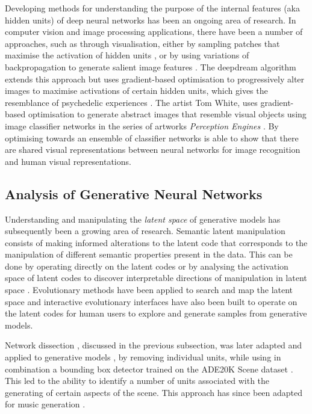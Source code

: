 Developing methods for understanding the purpose of the internal features (aka hidden units) of deep neural networks has been an ongoing area of research. 
In computer vision and image processing applications, there have been a number of approaches, such as through visualisation, either by sampling patches that maximise the activation of hidden units \cite{zeiler2014visualizing, zhou2014object}, or by using variations of backpropagation to generate salient image features \cite{zeiler2014visualizing, simonyan2013deep}. 
The deepdream algorithm \citep{mordvintsev2015inceptionism} extends this approach but uses gradient-based optimisation to progressively alter images to maximise activations of certain hidden units, which gives the resemblance of psychedelic experiences \citep{suzuki2017deep}.
The artist Tom White, uses gradient-based optimisation to generate abstract images that resemble visual objects using image classifier networks in the series of artworks \textit{Perception Engines} \citep{white2018perception}.
By optimising towards an ensemble of classifier networks \cite{white2019shared} is able to show that there are shared visual representations between neural networks for image recognition and human visual representations.

\subsection{Analysis of Generative Neural Networks}

Understanding and manipulating the \emph{latent space} of generative models has subsequently been a growing area of research. 
Semantic latent manipulation consists of making informed alterations to the latent code that corresponds to the manipulation of different semantic properties present in the data. 
This can be done by operating directly on the latent codes \citep{brock2016neural, shen2020interpreting} or by analysing the activation space of latent codes to discover interpretable directions of manipulation in latent space \citep{harkonen2020ganspace}. 
Evolutionary methods have been applied to search and map the latent space \citep{bontrager2018deepmasterprints, fernandes2020evolutionary} and interactive evolutionary interfaces have also been built to operate on the latent codes \citep{Simon-ganbreeder} for human users to explore and generate samples from generative models. 

Network dissection \citep{Bau2018-td}, discussed in the previous subsection, was later adapted and applied to generative models \citep{Bau2018-td}, by removing individual units, while using in combination a bounding box detector trained on the ADE20K Scene dataset \citep{zhou2017scene}. 
This led to the ability to identify a number of units associated with the generating of certain aspects of the scene. 
This approach has since been adapted for music generation \citep{Brink2019-gc}. 

